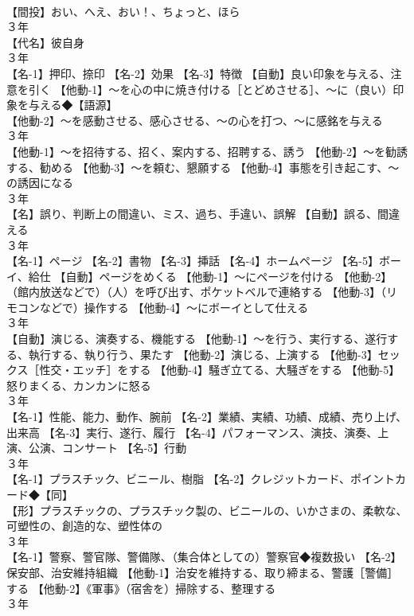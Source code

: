 \documentclass[8pt]{extreport}
\begin{document}
\begin{CJK}{UTF8}{min}
\\	【間投】おい、へえ、おい！、ちょっと、ほら
\\	３年	
\\	【代名】彼自身
\\	３年	
\\	【名-1】押印、捺印 【名-2】効果 【名-3】特徴 【自動】良い印象を与える、注意を引く 【他動-1】～を心の中に焼き付ける［とどめさせる］、～に（良い）印象を与える◆【語源】
\\	【他動-2】～を感動させる、感心させる、～の心を打つ、～に感銘を与える
\\	３年	
\\	【他動-1】～を招待する、招く、案内する、招聘する、誘う 【他動-2】～を勧誘する、勧める 【他動-3】～を頼む、懇願する 【他動-4】事態を引き起こす、～の誘因になる
\\	３年	
\\	【名】誤り、判断上の間違い、ミス、過ち、手違い、誤解 【自動】誤る、間違える
\\	３年	
\\	【名-1】ページ 【名-2】書物 【名-3】挿話 【名-4】ホームページ 【名-5】ボーイ、給仕 【自動】ページをめくる 【他動-1】～にページを付ける 【他動-2】（館内放送などで）（人）を呼び出す、ポケットベルで連絡する 【他動-3】（リモコンなどで）操作する 【他動-4】～にボーイとして仕える
\\	３年	
\\	【自動】演じる、演奏する、機能する 【他動-1】～を行う、実行する、遂行する、執行する、執り行う、果たす 【他動-2】演じる、上演する 【他動-3】セックス［性交・エッチ］をする 【他動-4】騒ぎ立てる、大騒ぎをする 【他動-5】怒りまくる、カンカンに怒る
\\	３年	
\\	【名-1】性能、能力、動作、腕前 【名-2】業績、実績、功績、成績、売り上げ、出来高 【名-3】実行、遂行、履行 【名-4】パフォーマンス、演技、演奏、上演、公演、コンサート 【名-5】行動
\\	３年	
\\	【名-1】プラスチック、ビニール、樹脂 【名-2】クレジットカード、ポイントカード◆【同】
\\	【形】プラスチックの、プラスチック製の、ビニールの、いかさまの、柔軟な、可塑性の、創造的な、塑性体の
\\	３年	
\\	【名-1】警察、警官隊、警備隊、（集合体としての）警察官◆複数扱い 【名-2】保安部、治安維持組織 【他動-1】治安を維持する、取り締まる、警護［警備］する 【他動-2】《軍事》（宿舎を）掃除する、整理する
\\	３年	

\end{CJK}
\end{document}
